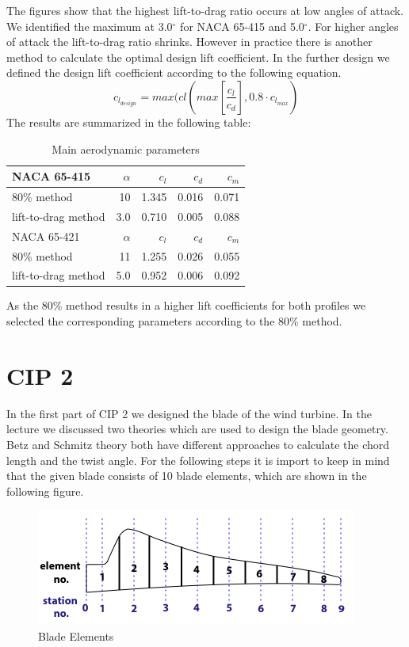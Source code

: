 \documentclass[10pt]{article}
\begin{document}
The figures show that the highest lift-to-drag ratio occurs at low angles of attack. We identified the maximum at 3.0$^\circ$ for NACA 65-415 and 5.0$^\circ$. For higher angles of attack the lift-to-drag ratio shrinks. However in practice there is another method to calculate the optimal design lift coefficient. In the further design we defined the design lift coefficient according to the following equation.
\begin{equation}
c_{l_{design}} = max(cl(max[\frac{c_l}{c_d}], 0.8\cdot c_{l_{max}})
\end{equation}
The results are summarized in the following table:\\
\begin{table}[H]
\begin{tabular}{l | r r r r}
NACA 65-415 & $\alpha$ &$c_l$ &$c_d$ & $c_m$\\
\hline
80\% method& 10 & 1.345 & 0.016 & 0.071\\
lift-to-drag method & 3.0 & 0.710 & 0.005 &  0.088\\
\hline
NACA 65-421 & $\alpha$ &$c_l$ &$c_d$ & $c_m$\\
\hline
80\% method& 11 & 1.255 & 0.026 & 0.055\\
lift-to-drag method & 5.0 & 0.952 & 0.006 &  0.092\\
\end{tabular}
\caption{Main aerodynamic parameters}
\end{table}

As the 80\% method results in a higher lift coefficients for both profiles we selected the corresponding parameters according to the 80\% method.
\newpage
\section{CIP 2}
In the first part of CIP 2 we designed the blade of the wind turbine. In the lecture we discussed two theories which are used to design the blade geometry. Betz and Schmitz theory both have different approaches to calculate the chord length and the twist angle. For the following steps it is import to keep in mind that the given blade consists of 10 blade elements, which are shown in the following figure.
\begin{figure}[H]
\includegraphics[width=1\linewidth]{../CIP_2/Figures/blade_elements.png}
\caption{Blade Elements}
\label{fig:blade_elemets}
\end{figure}
\end{document}
